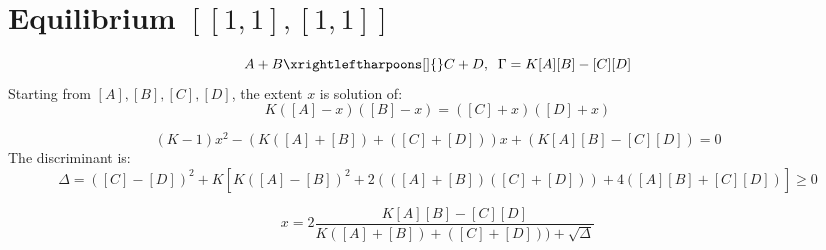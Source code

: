 \documentclass[aps,12pt]{revtex4}
\begin{document}
\section{Equilibrium $[[1,1],[1,1]]$}
\begin{equation}
	A+B\xrightleftharpoons[]{} C+D, \;\; \Gamma = K[A][B] - [C][D]
\end{equation}
Starting from $[A],[B],[C],[D]$, the extent $x$ is solution of:
\begin{equation}
	K([A]-x)([B]-x) = ([C]+x)([D]+x) 
\end{equation}

\begin{equation}
	(K-1)x^2 - ( K([A]+[B]) + ([C]+[D])) x + (K[A][B] - [C][D]) = 0
\end{equation}
The discriminant is:
\begin{equation}
	\Delta = ([C]-[D])^2 + K \left[ K([A]-[B])^2 + 2(([A]+[B])([C]+[D]))+4([A][B]+[C][D]) \right] \geq 0
\end{equation}

\begin{equation}
x = 2 \dfrac{K[A][B]-[C][D]}{ K([A]+[B]) + ([C]+[D])) + \sqrt{\Delta} }
\end{equation}
\end{document}
